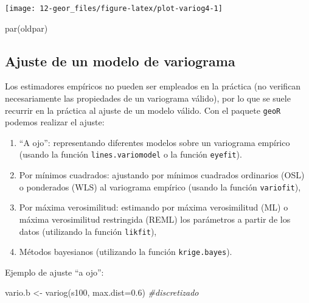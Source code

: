 \documentclass[
  spanish,
]{book}
\newenvironment{Shaded}{\begin{snugshade}}{\end{snugshade}}
\newcommand{\AttributeTok}[1]{\textcolor[rgb]{0.77,0.63,0.00}{#1}}
\newcommand{\CommentTok}[1]{\textcolor[rgb]{0.56,0.35,0.01}{\textit{#1}}}
\newcommand{\FloatTok}[1]{\textcolor[rgb]{0.00,0.00,0.81}{#1}}
\newcommand{\FunctionTok}[1]{\textcolor[rgb]{0.00,0.00,0.00}{#1}}
\newcommand{\NormalTok}[1]{#1}
\newcommand{\OtherTok}[1]{\textcolor[rgb]{0.56,0.35,0.01}{#1}}
\theoremstyle{break}
\theoremstyle{definition}
\theoremstyle{definition}
\theoremstyle{definition}
\theoremstyle{definition}
\theoremstyle{remark}
\begin{document}
\begin{center}\texttt{[image: 12-geor\_files/figure-latex/plot-variog4-1]} \end{center}

\begin{Shaded}
\begin{Highlighting}[]
\FunctionTok{par}\NormalTok{(oldpar)}
\end{Highlighting}
\end{Shaded}

\hypertarget{ajuste-de-un-modelo-de-variograma}{%
\subsection{Ajuste de un modelo de variograma}\label{ajuste-de-un-modelo-de-variograma}}

Los estimadores empíricos no pueden ser empleados en la práctica (no
verifican necesariamente las propiedades de un variograma válido), por
lo que se suele recurrir en la práctica al ajuste de un modelo válido.
Con el paquete \texttt{geoR} podemos realizar el ajuste:

\begin{enumerate}
\def\labelenumi{\arabic{enumi}.}
\item
  ``A ojo'': representando diferentes modelos sobre un variograma
  empírico (usando la función \texttt{lines.variomodel} o la función
  \texttt{eyefit}).
\item
  Por mínimos cuadrados: ajustando por mínimos cuadrados
  ordinarios (OSL) o ponderados (WLS) al variograma empírico (usando
  la función \texttt{variofit}),
\item
  Por máxima verosimilitud: estimando por máxima verosimilitud (ML) o
  máxima verosimilitud restringida (REML) los parámetros a partir de
  los datos (utilizando la función \texttt{likfit}),
\item
  Métodos bayesianos (utilizando la función \texttt{krige.bayes}).
\end{enumerate}

Ejemplo de ajuste ``a ojo'':

\begin{Shaded}
\begin{Highlighting}[]
\NormalTok{vario.b }\OtherTok{\textless{}{-}} \FunctionTok{variog}\NormalTok{(s100, }\AttributeTok{max.dist=}\FloatTok{0.6}\NormalTok{) }\CommentTok{\#discretizado}
\end{Highlighting}
\end{Shaded}
\end{document}
